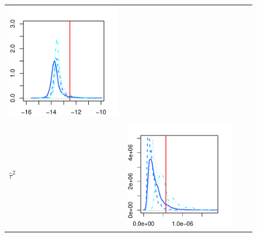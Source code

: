 \documentclass[10pt]{article}
\newcommand{\htau}{\hat{\tau}}
\begin{document}
\begin{figure}[h!]
\begin{tabular}{m{0.25cm}ccc}
\begin{minipage}{0.20\textwidth}
				\includegraphics[width=1\linewidth]{results-real-data-plots-ALPHAS-microstructure-ALPHA-XI-Inf-SDs-0.pdf}
				\end{minipage}  \\
%
		\begin{sideways} $\htau^2$ \end{sideways}
			& \begin{minipage}{0.20\textwidth}
				\centering
				\includegraphics[width=1\linewidth]{results-real-data-plots-TAUS-SQ-microstructure-TAU-SQ-XI-0-SDs-0.pdf}

\end{minipage}
\end{tabular}
\end{figure}
\end{document}
